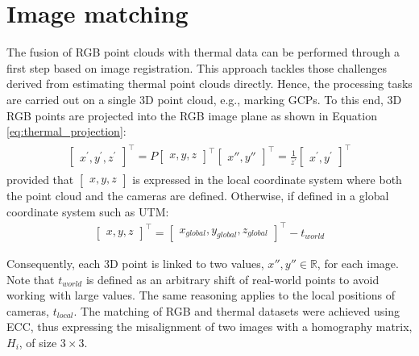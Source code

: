\section{Image matching}

The fusion of RGB point clouds with thermal data can be performed through a first step based on image registration. This approach tackles those challenges derived from estimating thermal point clouds directly. Hence, the processing tasks are carried out on a single 3D point cloud, e.g., marking GCPs. To this end, 3D RGB points are projected into the RGB image plane as shown in Equation \ref{eq:thermal_projection}:
\begin{gather}
    \label{eq:thermal_projection}
    \begin{aligned}
        \begin{bmatrix} x^\prime, y^\prime, z^\prime \end{bmatrix}^\intercal = P \begin{bmatrix} x, y, z\end{bmatrix}^\intercal
        \begin{bmatrix} x'', y'' \end{bmatrix}^\intercal = \frac{1}{z^\prime} \begin{bmatrix} x^\prime, y^\prime \end{bmatrix}^\intercal
    \end{aligned}
\end{gather}
provided that $\begin{bmatrix} x, y, z\end{bmatrix}$ is expressed in the local coordinate system where both the point cloud and the cameras are defined. Otherwise, if defined in a global coordinate system such as UTM:
\begin{gather}
    \label{eq:thermal_projection_2}
    \begin{bmatrix} x, y, z \end{bmatrix}^\intercal = \begin{bmatrix} x_{\textit{global}}, y_{\textit{global}}, z_{\textit{global}} \end{bmatrix}^\intercal - t_{\textit{world}}
\end{gather}

Consequently, each 3D point is linked to two values, $x'', y'' \in \mathbb{R}$, for each image. Note that $t_{\textit{world}}$ is defined as an arbitrary shift of real-world points to avoid working with large values. The same reasoning applies to the local positions of cameras, $t_{\textit{local}}$. The matching of RGB and thermal datasets were achieved using ECC, thus expressing the misalignment of two images with a homography matrix, $H_i$, of size $3\times3$.

